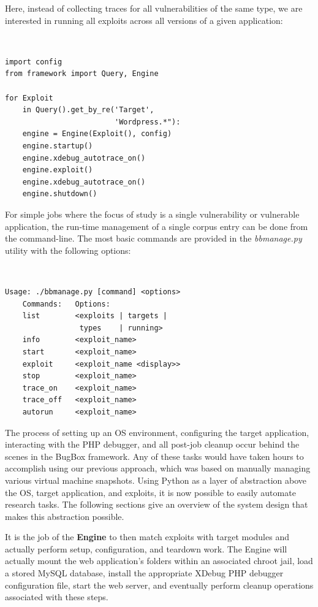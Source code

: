 \documentclass[letterpaper,twocolumn,10pt]{article}
\begin{document}

Here, instead of collecting traces for all vulnerabilities of the same type, we are interested in running all exploits across all versions of a given application:

\begin{minipage}{\textwidth}
{\tt \footnotesize
\begin{lstlisting}
import config
from framework import Query, Engine

for Exploit 
    in Query().get_by_re('Target', 
                         'Wordpress.*"):
    engine = Engine(Exploit(), config)
    engine.startup()
    engine.xdebug_autotrace_on()
    engine.exploit()
    engine.xdebug_autotrace_on()
    engine.shutdown()
\end{lstlisting}
}
\end{minipage}

For simple jobs where the focus of study is a single vulnerability or vulnerable application, the run-time management of a single corpus entry can be done from the command-line. The most basic commands are provided in the \emph{bbmanage.py} utility with the following options:

{\tt \footnotesize
\begin{verbatim}
Usage: ./bbmanage.py [command] <options>
    Commands:   Options:
    list        <exploits | targets | 
                 types    | running>
    info        <exploit_name>
    start       <exploit_name>
    exploit     <exploit_name <display>>
    stop        <exploit_name>
    trace_on    <exploit_name>
    trace_off   <exploit_name>
    autorun     <exploit_name>
\end{verbatim}
}

The process of setting up an OS environment, configuring the target application, interacting with the PHP debugger, and all post-job cleanup occur behind the scenes in the BugBox framework. Any of these tasks would have taken hours to accomplish using our previous approach, which was based on manually managing various virtual machine snapshots. Using Python as a layer of abstraction above the OS, target application, and exploits, it is now possible to easily automate research tasks. The following sections give an overview of the system design that makes this abstraction possible.

It is the job of the {\bf Engine} to then match exploits with target modules and actually perform setup, configuration, and teardown work. The Engine will actually mount the web application's folders within an associated chroot jail, load a stored MySQL database, install the appropriate XDebug PHP debugger configuration file, start the web server, and eventually perform cleanup operations associated with these steps.
\end{document}
